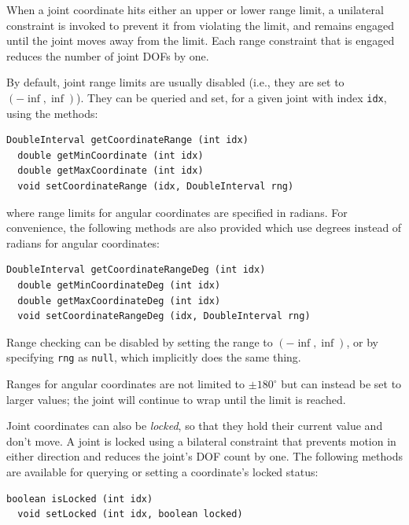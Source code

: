 When a joint coordinate hits either an upper or lower range limit, a
unilateral constraint is invoked to prevent it from violating the
limit, and remains engaged until the joint moves away from the
limit. Each range constraint that is engaged reduces the number of
joint DOFs by one.

By default, joint range limits are usually disabled (i.e., they are
set to $(-\inf, \inf)$). They can be queried and set, for a given
joint with index {\tt idx}, using the methods:
\begin{lstlisting}[]
  DoubleInterval getCoordinateRange (int idx)	
  double getMinCoordinate (int idx)
  double getMaxCoordinate (int idx)
  void setCoordinateRange (idx, DoubleInterval rng)
\end{lstlisting}
%
where range limits for angular coordinates are specified in
radians. For convenience, the following methods are also provided
which use degrees instead of radians for angular coordinates:
\begin{lstlisting}[]
  DoubleInterval getCoordinateRangeDeg (int idx)
  double getMinCoordinateDeg (int idx)
  double getMaxCoordinateDeg (int idx)
  void setCoordinateRangeDeg (idx, DoubleInterval rng)
\end{lstlisting}
%
Range checking can be disabled by setting the range to
$(-\inf, \inf)$, or by specifying {\tt rng} as {\tt null}, which
implicitly does the same thing.

\begin{sideblock}
Ranges for angular coordinates are not limited to $\pm 180^\circ$ but
can instead be set to larger values; the joint will continue to wrap
until the limit is reached.
\end{sideblock}

Joint coordinates can also be {\it locked}, so that they hold their
current value and don't move. A joint is locked using a bilateral
constraint that prevents motion in either direction and reduces the
joint's DOF count by one.  The following methods are available for
querying or setting a coordinate's locked status:
\begin{lstlisting}[]
  boolean isLocked (int idx)	
  void setLocked (int idx, boolean locked)
\end{lstlisting}
%

